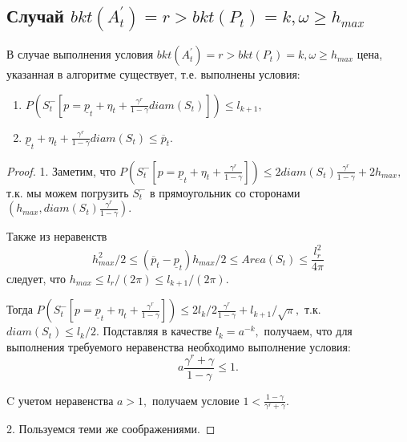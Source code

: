\documentclass[12 pt, russian]{article}
\begin{document}
\subsection{Случай $bkt(A^{'}_t) = r > bkt(P_t) = k, \omega \geq h_{max}$}
\statement
В случае выполнения условия $bkt(A^{'}_t) = r > bkt(P_t) = k, \omega \geq h_{max}$ цена, указанная в алгоритме существует, т.е. выполнены условия:
\begin{enumerate}
    \item $P(S^{-}_t[p = \underline{p}_t + \eta_t + \frac{\gamma^r}{1 - \gamma}diam(S_t)]) \leq l_{k + 1},$
    \item $\underline{p}_t + \eta_t + \frac{\gamma^r}{1 - \gamma}diam(S_t) \leq \overline{p}_t.$
\end{enumerate}
\begin{proof}
1. Заметим, что $P(S^{-}_t[p = \underline{p}_t + \eta_t + \frac{\gamma^r}{1 - \gamma}]) \leq 2 diam(S_t) \frac{\gamma^r}{1 - \gamma} + 2 h_{max},$ т.к. мы можем погрузить $S^{-}_t$ в прямоугольник со сторонами $(h_{max}, diam(S_t) \frac{\gamma^r}{1 - \gamma}).$

Также из неравенств $$h^2_{max} / 2 \leq (\overline{p}_t - \underline{p}_t) h_{max} / 2 \leq Area(S_t) \leq \frac{l^2_r}{4 \pi}$$ следует, что $h_{max} \leq l_r / (2 \pi) \leq l_{k + 1} / (2 \pi).$

Тогда $P(S^{-}_t[p = \underline{p}_t + \eta_t + \frac{\gamma^r}{1 - \gamma}]) \leq 2 l_k / 2 \frac{\gamma^r}{1 - \gamma} + l_{k + 1} / \sqrt{\pi},$ т.к. $diam(S_t) \leq l_k / 2.$ Подставляя в качестве $l_k = a^{-k},$ получаем, что для выполнения требуемого неравенства необходимо выполнение условия:
$$a \frac{\gamma^r + \gamma}{1 - \gamma} \leq 1.$$

C учетом неравенства $a > 1,$ получаем условие $1 < \frac{1 - \gamma}{\gamma^r + \gamma}.$

2. Пользуемся теми же соображениями.
\end{proof}
\end{document}
